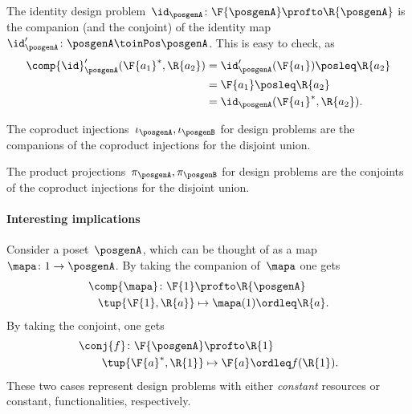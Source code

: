 \begin{example}
  The identity design problem~$\id_\posgenA\colon \F{\posgenA} \profto \R{\posgenA}$ is the companion (and the conjoint) of the identity map~$\id_\posgenA'\colon \posgenA \toinPos \posgenA$.
  This is easy to check, as
  \begin{equation}
    \begin{aligned}
      \comp{\id}_\posgenA'(\F{a_1}^*,\R{a_2})&=\id_\posgenA'(\F{a_1})\posleq \R{a_2}\\
      &=\F{a_1}\posleq \R{a_2}\\
      &=\id_\posgenA(\F{a_1}^*,\R{a_2}).
    \end{aligned}
  \end{equation}
\end{example}

\begin{example}
  The coproduct injections~$\iota_\posgenA, \iota_\posgenB$ for design problems are the companions of the coproduct injections for the disjoint union.
\end{example}

\begin{example}
  The product projections~$\pi_\posgenA, \pi_\posgenB$ for design problems are the conjoints of the coproduct injections for the disjoint union.
\end{example}

\paragraph{Interesting implications}
Consider a poset~$\posgenA$, which can be thought of as a map~$\mapa \colon 1\to \posgenA$. By taking the companion of~$\mapa$ one gets
\begin{equation}
  \begin{aligned}
    \comp{\mapa}\colon \F{1}&\profto \R{\posgenA}\\
    \tup{\F{1},\R{a}}&\mapsto \mapa(1)\ordleq \R{a}.
  \end{aligned}
\end{equation}
By taking the conjoint, one gets
\begin{equation}
  \begin{aligned}
    \conj{f}\colon \F{\posgenA}&\profto \R{1}\\
    \tup{\F{a}^*,\R{1}}&\mapsto \F{a}\ordleq f(\R{1}).
  \end{aligned}
\end{equation}
These two cases represent design problems with either \emph{constant} resources or constant, functionalities, respectively.
